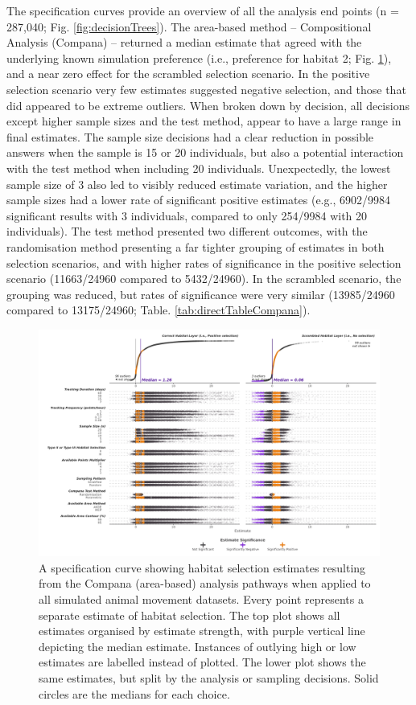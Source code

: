 \documentclass[10pt,a4paper]{article}
\begin{document}
The specification curves provide an overview of all the analysis end points (n = 287,040; Fig. \ref{fig:decisionTrees}).
The area-based method -- Compositional Analysis (Compana) -- returned a median estimate that agreed with the underlying known simulation preference (i.e., preference for habitat 2; Fig. \ref{fig:specCurveArea}), and a near zero effect for the scrambled selection scenario.
In the positive selection scenario very few estimates suggested negative selection, and those that did appeared to be extreme outliers.
When broken down by decision, all decisions except higher sample sizes and the test method, appear to have a large range in final estimates.
The sample size decisions had a clear reduction in possible answers when the sample is 15 or 20 individuals, but also a potential interaction with the test method when including 20 individuals.
Unexpectedly, the lowest sample size of 3 also led to visibly reduced estimate variation, and the higher sample sizes had a lower rate of significant positive estimates (e.g., 6902/9984 significant results with 3 individuals, compared to only 254/9984 with 20 individuals).
The test method presented two different outcomes, with the randomisation method presenting a far tighter grouping of estimates in both selection scenarios, and with higher rates of significance in the positive selection scenario (11663/24960 compared to 5432/24960).
In the scrambled scenario, the grouping was reduced, but rates of significance were very similar (13985/24960 compared to 13175/24960; Table. \ref{tab:directTableCompana}).

\begin{figure}
\includegraphics[width=1\linewidth]{../figures/area_specCurve} \caption{A specification curve showing habitat selection estimates resulting from the Compana (area-based) analysis pathways when applied to all simulated animal movement datasets. Every point represents a separate estimate of habitat selection. The top plot shows all estimates organised by estimate strength, with purple vertical line depicting the median estimate. Instances of outlying high or low estimates are labelled instead of plotted. The lower plot shows the same estimates, but split by the analysis or sampling decisions. Solid circles are the medians for each choice.}\label{fig:specCurveArea}
\end{figure}
\end{document}
